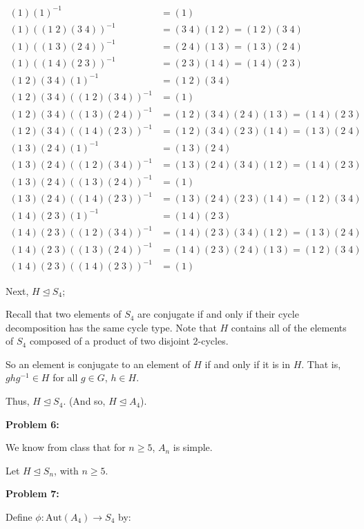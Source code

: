 \documentclass[a4paper,12pt]{article}
\newcommand{\tab}{\hspace{4mm}} %
\newcommand{\shunt}{\vspace{20mm}}
\newcommand{\subgp}{\mathrel{\unlhd}}
\begin{document}
\begin{align*}
(1) (1)^{-1} &= (1)\\
(1) ((1 \; 2)(3 \; 4))^{-1} &= (3 \; 4)(1 \; 2) = (1 \; 2)(3 \; 4)\\
(1) ((1 \; 3) (2 \; 4))^{-1} &= (2 \; 4) (1 \; 3)  =  (1 \; 3) (2 \; 4)\\
(1) ((1 \; 4) (2 \; 3))^{-1} &=  (2 \; 3) (1 \; 4)= (1 \; 4) (2 \; 3)\\
(1 \; 2)(3 \; 4) (1)^{-1} &= (1 \; 2)(3 \; 4)\\
(1 \; 2)(3 \; 4) ((1 \; 2)(3 \; 4))^{-1} &= (1)\\
(1 \; 2)(3 \; 4) ((1 \; 3) (2 \; 4))^{-1} &= (1 \; 2)(3 \; 4) (2 \; 4) (1 \; 3) = (1 \; 4) (2 \; 3)\\
(1 \; 2)(3 \; 4) ((1 \; 4) (2 \; 3))^{-1} &= (1 \; 2)(3 \; 4) (2 \; 3) (1 \; 4) = (1 \; 3) (2 \; 4)\\
(1 \; 3) (2 \; 4) (1)^{-1} &= (1 \; 3) (2 \; 4)\\
(1 \; 3) (2 \; 4) ((1 \; 2)(3 \; 4))^{-1} &= (1 \; 3) (2 \; 4) (3 \; 4) (1 \; 2) =(1 \; 4) (2 \; 3)\\
(1 \; 3) (2 \; 4) ((1 \; 3) (2 \; 4))^{-1} &= (1)\\
(1 \; 3) (2 \; 4) ((1 \; 4) (2 \; 3))^{-1} &= (1 \; 3) (2 \; 4) (2 \; 3) (1 \; 4) = (1 \; 2) (3 \; 4)\\
(1 \; 4) (2 \; 3) (1)^{-1} &= (1 \; 4) (2 \; 3)\\
(1 \; 4) (2 \; 3) ((1 \; 2)(3 \; 4))^{-1} &= (1 \; 4) (2 \; 3) (3 \; 4) (1 \; 2) = (1 \; 3) (2 \; 4)\\
(1 \; 4) (2 \; 3) ((1 \; 3) (2 \; 4))^{-1} &= (1 \; 4) (2 \; 3) (2 \; 4) (1 \; 3) = (1 \; 2) (3 \; 4)\\
(1 \; 4) (2 \; 3) ((1 \; 4) (2 \; 3))^{-1} &= (1)
\end{align*}

Next, $H \subgp S_4$;

\tab Recall that two elements of $S_4$ are conjugate if and only if their cycle decomposition has the same cycle type. Note that $H$ contains all of the elements of $S_4$ composed of a product of two disjoint $2$-cycles.

\tab So an element is conjugate to an element of $H$ if and only if it is in $H$. That is, $ghg^{-1} \in H$ for all $g \in G$, $h \in H$.

Thus, $H \subgp S_4$. (And so, $H \subgp A_4$).

\shunt

{\bf Problem 6:}

We know from class that for $n \geq 5$, $A_n$ is simple.

Let $H \subgp S_n$, with $n \geq 5$.

\shunt

{\bf Problem 7:}

Define $\phi: \text{Aut}(A_4) \to S_4$ by:


\shunt
\end{document}
